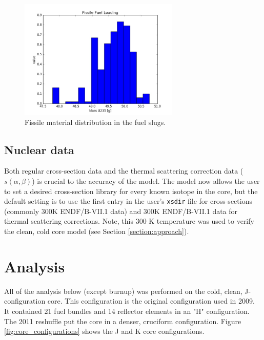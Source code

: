 \documentclass{UWNR_modeling}
\begin{document}
\begin{figure}[H]
  \centering
  \includegraphics[width=3in]{mass235.jpeg}
  \caption{Fissile material distribution in the fuel slugs.}
  \label{fig:235_dist}
\end{figure}

\subsection{Nuclear data}

Both regular cross-section data and the thermal scattering correction data ($s(\alpha,\beta)$) is crucial to the accuracy of the model. The model now allows the user to set a desired cross-section library for every known isotope in the core, but the default setting is to use the first entry in the user's \texttt{xsdir} file for cross-sections (commonly 300K ENDF/B-VII.1 data) and 300K ENDF/B-VII.1 data for thermal scattering corrections.  Note, this 300 K temperature was used to verify the clean, cold core model (see Section \ref{section:approach}). 

\section{Analysis}\label{section:analysis}
All of the analysis below (except burnup) was performed on the cold, clean, J-configuration core. This configuration is the original configuration used in 2009. It contained 21 fuel bundles and 14 reflector elements in an "H" configuration. The 2011 reshuffle put the core in a denser, cruciform configuration. Figure \ref{fig:core_configurations} shows the J and K core configurations.
\end{document}

